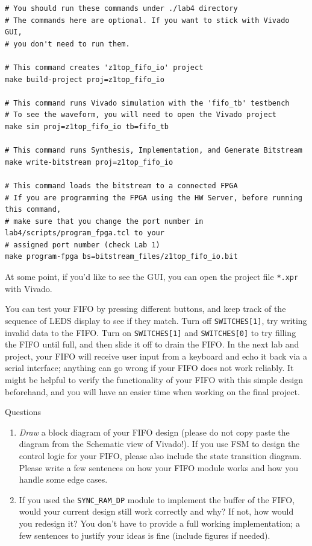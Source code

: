 \documentclass[11pt]{article}
\makeatletter
\renewcommand{\subsection}
{\@startsection {subsection}{1}{0pt}
 {-1ex}
 {0.5ex}
 {\bfseries\normalsize}}
\makeatother
\begin{document}
\begin{verbatim}
# You should run these commands under ./lab4 directory
# The commands here are optional. If you want to stick with Vivado GUI,
# you don't need to run them.

# This command creates 'z1top_fifo_io' project
make build-project proj=z1top_fifo_io

# This command runs Vivado simulation with the 'fifo_tb' testbench
# To see the waveform, you will need to open the Vivado project
make sim proj=z1top_fifo_io tb=fifo_tb

# This command runs Synthesis, Implementation, and Generate Bitstream
make write-bitstream proj=z1top_fifo_io

# This command loads the bitstream to a connected FPGA
# If you are programming the FPGA using the HW Server, before running this command,
# make sure that you change the port number in lab4/scripts/program_fpga.tcl to your
# assigned port number (check Lab 1)
make program-fpga bs=bitstream_files/z1top_fifo_io.bit

\end{verbatim}

At some point, if you'd like to see the GUI, you can open the project file \verb|*.xpr| with Vivado.

You can test your FIFO by pressing different buttons, and keep track of the sequence of LEDS display to see if they match. Turn off \verb|SWITCHES[1]|, try writing invalid data to the FIFO. Turn on \verb|SWITCHES[1]| and \verb|SWITCHES[0]| to try filling the FIFO until full, and then slide it off to drain the FIFO. In the next lab and project, your FIFO will receive user input from a keyboard and echo it back via a serial interface; anything can go wrong if your FIFO does not work reliably. It might be helpful to verify the functionality of your FIFO with this simple design beforehand, and you will have an easier time when working on the final project.

\subsection{Questions}\label{sec:Q1}
\begin{enumerate}
\item \textit{Draw} a block diagram of your FIFO design (please do not copy paste the diagram from the Schematic view of Vivado!). If you use FSM to design the control logic for your FIFO, please also include the state transition diagram. Please write a few sentences on how your FIFO module works and how you handle some edge cases.
\item If you used the \verb|SYNC_RAM_DP| module to implement the buffer of the FIFO, would your current design still work correctly and why? If not, how would you redesign it? You don't have to provide a full working implementation; a few sentences to justify your ideas is fine (include figures if needed).
\end{enumerate}
\end{document}
